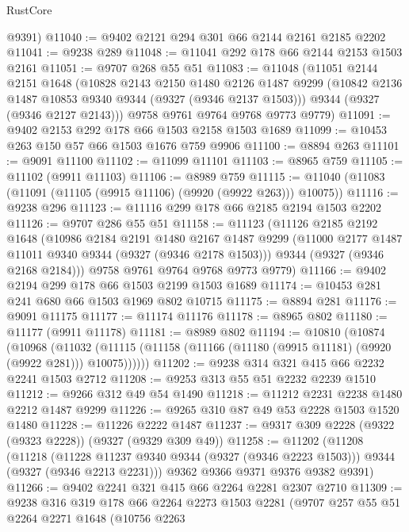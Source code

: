 \begin{lexlean}{RustCore}
\begin{coremodule}
      @9391)
@11040 := @9402 @2121 @294 @301 @66 @2144 @2161 @2185 @2202
@11041 := @9238 @289
@11048 := @11041 @292 @178 @66 @2144 @2153 @1503 @2161
@11051 := @9707 @268 @55 @51
@11083 := @11048
    (@11051
      @2144
      @2151
      @1648
      (@10828
        @2143
        @2150
        @1480
        @2126
        @1487
        @9299
        (@10842 @2136 @1487 @10853 @9340 @9344 (@9327 (@9346 @2137 @1503)))
        @9344
        (@9327 (@9346 @2127 @2143)))
      @9758
      @9761
      @9764
      @9768
      @9773
      @9779)
@11091 := @9402 @2153 @292 @178 @66 @1503 @2158 @1503 @1689
@11099 := @10453 @263 @150 @57 @66 @1503 @1676 @759 @9906
@11100 := @8894 @263
@11101 := @9091 @11100
@11102 := @11099 @11101
@11103 := @8965 @759
@11105 := @11102 (@9911 @11103)
@11106 := @8989 @759
@11115 := @11040 (@11083 (@11091 (@11105 (@9915 @11106) (@9920 (@9922 @263))) @10075))
@11116 := @9238 @296
@11123 := @11116 @299 @178 @66 @2185 @2194 @1503 @2202
@11126 := @9707 @286 @55 @51
@11158 := @11123
    (@11126
      @2185
      @2192
      @1648
      (@10986
        @2184
        @2191
        @1480
        @2167
        @1487
        @9299
        (@11000 @2177 @1487 @11011 @9340 @9344 (@9327 (@9346 @2178 @1503)))
        @9344
        (@9327 (@9346 @2168 @2184)))
      @9758
      @9761
      @9764
      @9768
      @9773
      @9779)
@11166 := @9402 @2194 @299 @178 @66 @1503 @2199 @1503 @1689
@11174 := @10453 @281 @241 @680 @66 @1503 @1969 @802 @10715
@11175 := @8894 @281
@11176 := @9091 @11175
@11177 := @11174 @11176
@11178 := @8965 @802
@11180 := @11177 (@9911 @11178)
@11181 := @8989 @802
@11194 := @10810
    (@10874
      (@10968
        (@11032 (@11115 (@11158 (@11166 (@11180 (@9915 @11181) (@9920 (@9922 @281))) @10075))))))
@11202 := @9238 @314 @321 @415 @66 @2232 @2241 @1503 @2712
@11208 := @9253 @313 @55 @51 @2232 @2239 @1510
@11212 := @9266 @312 @49 @54 @1490
@11218 := @11212 @2231 @2238 @1480 @2212 @1487 @9299
@11226 := @9265 @310 @87 @49 @53 @2228 @1503 @1520 @1480
@11228 := @11226 @2222 @1487
@11237 := @9317 @309 @2228 (@9322 (@9323 @2228)) (@9327 (@9329 @309 @49))
@11258 := @11202
    (@11208
      (@11218
        (@11228 @11237 @9340 @9344 (@9327 (@9346 @2223 @1503)))
        @9344
        (@9327 (@9346 @2213 @2231)))
      @9362
      @9366
      @9371
      @9376
      @9382
      @9391)
@11266 := @9402 @2241 @321 @415 @66 @2264 @2281 @2307 @2710
@11309 := @9238
    @316
    @319
    @178
    @66
    @2264
    @2273
    @1503
    @2281
    (@9707
      @257
      @55
      @51
      @2264
      @2271
      @1648
      (@10756
        @2263

\end{coremodule}
\end{lexlean}
